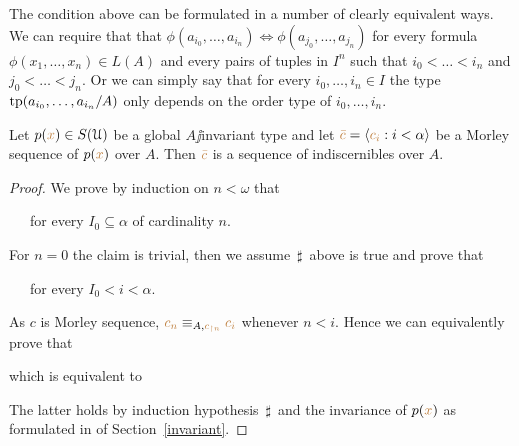 \documentclass[creche.tex]{subfiles}
\begin{document}
The condition above can be formulated in a number of clearly equivalent ways. We can require that that $\phi(a_{i_0},\dots,a_{i_n})\iff\phi(a_{j_0},\dots,a_{j_n})$ for every formula $\phi(x_1,\dots,x_n)\in L(A)$ and every pairs of tuples in $I^n$ such that $i_0<\dots<i_n$ and $j_0<\dots<j_n$. Or we can simply say that for every $i_0,\dots,i_n\in I$ the type ${\rm tp}(a_{i_0},\dots,a_{i_n}/A)$ only depends on the order type of $i_0,\dots,i_n$.




\begin{proposition}
Let $p({\color{brown} x})\in S(\EuScript U)$ be a global $A\jj$invariant type and let ${\color{brown}\bar c}=\langle{\color{brown}c_i}:i<\alpha\rangle$ be a Morley sequence of $p({\color{brown} x})$ over $A$. Then ${\color{brown}\bar c}$ is a sequence of indiscernibles over $A$.
\end{proposition}

\begin{proof}


We prove by induction on $n<\omega$ that

\ \ \ for every $I_0\subseteq\alpha$ of cardinality $n$.

For $n=0$ the claim is trivial, then we assume $\,\sharp\,$ above is true and prove that

\ \ \ for every $I_0<i<\alpha$.

As $c$ is  Morley sequence, ${\color{brown} c_n}\equiv_{A,{\color{brown} c_{\restriction n}}} {\color{brown} c_i}$ whenever $n<i$. Hence we can equivalently prove that


which is equivalent to


The latter holds by induction hypothesis $\,\sharp\,$ and the invariance of $p({\color{brown} x})$ as formulated in  of Section~\ref{invariant}.
\end{proof}

\end{document}
